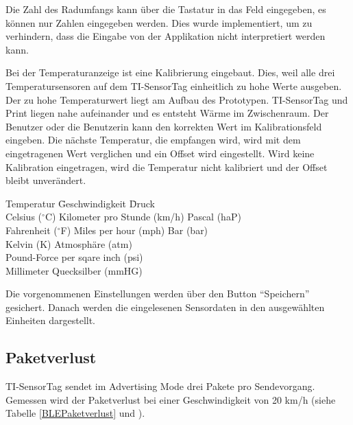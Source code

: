 Die Zahl des Radumfangs kann über die Tastatur in das Feld eingegeben, es können nur Zahlen eingegeben werden. Dies wurde implementiert, um zu verhindern, dass die Eingabe von der Applikation nicht interpretiert werden kann.

Bei der Temperaturanzeige ist eine Kalibrierung eingebaut. Dies, weil alle drei Temperatursensoren auf dem TI-SensorTag einheitlich zu hohe Werte ausgeben. Der zu hohe Temperaturwert liegt am Aufbau des Prototypen. TI-SensorTag und Print liegen nahe aufeinander und es entsteht Wärme im Zwischenraum. Der Benutzer oder die Benutzerin kann den korrekten Wert im Kalibrationsfeld eingeben. Die nächste Temperatur, die empfangen wird, wird mit dem eingetragenen Wert verglichen und ein Offset wird eingestellt. Wird keine Kalibration eingetragen, wird die Temperatur nicht kalibriert und der Offset bleibt unverändert.

\begin{minipage}{\textwidth}
    \begin{tabbing}
    Temperatur\hspace{.3cm} \quad\= Geschwindigkeit\hspace{2.7cm} \quad\= Druck \\[0.8ex]
    Celsius ($^{\circ}$C)    \> Kilometer pro Stunde (km/h)\> Pascal (haP)\\
    Fahrenheit ($^{\circ}$F) \> Miles per hour (mph)       \> Bar (bar)\\
    Kelvin (K)     \>                            \> Atmosph\"{a}re (atm)\\
                   \>                      \> Pound-Force per sqare inch (psi)\\
                   \>                      \> Millimeter Quecksilber (mmHG)\\
    \end{tabbing}
\end{minipage}
  
Die vorgenommenen Einstellungen werden über den Button ``Speichern'' gesichert. Danach werden die eingelesenen Sensordaten in den ausgewählten Einheiten dargestellt.

\subsection{Paketverlust}

TI-SensorTag sendet im Advertising Mode drei Pakete pro Sendevorgang. Gemessen wird der Paketverlust bei einer Geschwindigkeit von 20 km/h (siehe Tabelle \ref{BLEPaketverlust} und \cite{messung_BLE}). 

